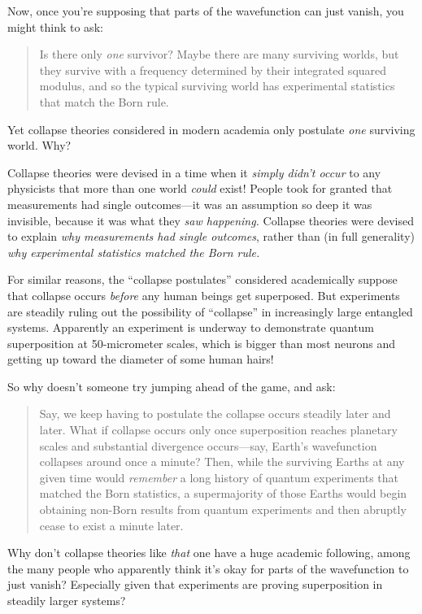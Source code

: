 {
 Now, once you're supposing that parts of the
wavefunction can just vanish, you might think to ask:}

\begin{quote}
{
 Is there only \textit{one} survivor? Maybe there are many
surviving worlds, but they survive with a frequency determined by their
integrated squared modulus, and so the typical surviving world has
experimental statistics that match the Born rule.}
\end{quote}

{
 Yet collapse theories considered in modern academia only postulate
\textit{one} surviving world. Why?}

{
 Collapse theories were devised in a time when it \textit{simply
didn't occur} to any physicists that more than one
world \textit{could} exist! People took for granted that measurements
had single outcomes---it was an assumption so deep it was invisible,
because it was what they \textit{saw happening.} Collapse theories were
devised to explain \textit{why measurements had single outcomes},
rather than (in full generality) \textit{why experimental statistics
matched the Born rule.}}

{
 For similar reasons, the ``collapse
postulates'' considered academically suppose that
collapse occurs \textit{before} any human beings get superposed. But
experiments are steadily ruling out the possibility of
``collapse'' in increasingly large
entangled systems. Apparently an experiment is underway to demonstrate
quantum superposition at 50-micrometer scales, which is bigger than
most neurons and getting up toward the diameter of some human hairs!}

{
 So why doesn't someone try jumping ahead of the
game, and ask:}

\begin{quote}
{
 Say, we keep having to postulate the collapse occurs steadily
later and later. What if collapse occurs only once superposition
reaches planetary scales and substantial divergence occurs---say,
Earth's wavefunction collapses around once a minute?
Then, while the surviving Earths at any given time would
\textit{remember} a long history of quantum experiments that matched
the Born statistics, a supermajority of those Earths would begin
obtaining non-Born results from quantum experiments and then abruptly
cease to exist a minute later.}
\end{quote}

{
 Why don't collapse theories like \textit{that} one
have a huge academic following, among the many people who apparently
think it's okay for parts of the wavefunction to just
vanish? Especially given that experiments are proving superposition in
steadily larger systems?}

